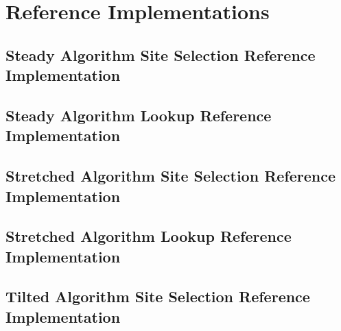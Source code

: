 \section{Reference Implementations}

\subsection{Steady Algorithm Site Selection Reference Implementation}



\subsection{Steady Algorithm Lookup Reference Implementation}



\subsection{Stretched Algorithm Site Selection Reference Implementation}



\subsection{Stretched Algorithm Lookup Reference Implementation}



\subsection{Tilted Algorithm Site Selection Reference Implementation}

